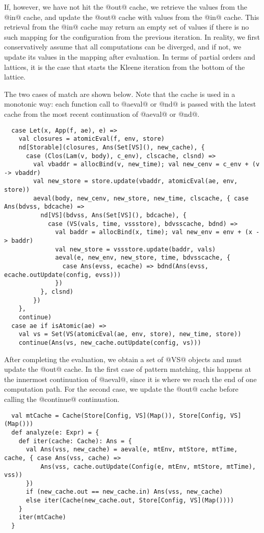 \documentclass[acmsmall, review]{acmart}\settopmatter{}
\begin{document}
If, however, we have not hit the @out@ cache, we retrieve the values from the @in@ cache, 
and update the @out@ cache with values from the @in@ cache. This retrieval from the @in@ 
cache may return an empty set of values if there is no such mapping for the configuration 
from the previous iteration.
In reality, we first conservatively assume that all computations can be diverged, and if 
not, we update its values in the mapping after evaluation. In terms of partial orders and 
lattices, it is the case that starts the Kleene iteration from the bottom of the lattice.

The two cases of match are shown below. Note that the cache is used in a monotonic way: 
each function call to @aeval@ or @nd@ is passed with the latest cache from the most recent 
continuation of @aeval@ or @nd@.

\begin{lstlisting}
  case Let(x, App(f, ae), e) =>
    val closures = atomicEval(f, env, store)
    nd[Storable](closures, Ans(Set[VS](), new_cache), {
      case (Clos(Lam(v, body), c_env), clscache, clsnd) =>
        val vbaddr = allocBind(v, new_time); val new_cenv = c_env + (v -> vbaddr)
        val new_store = store.update(vbaddr, atomicEval(ae, env, store))
        aeval(body, new_cenv, new_store, new_time, clscache, { case Ans(bdvss, bdcache) =>
          nd[VS](bdvss, Ans(Set[VS](), bdcache), {
            case (VS(vals, time, vssstore), bdvsscache, bdnd) =>
              val baddr = allocBind(x, time); val new_env = env + (x -> baddr)
              val new_store = vssstore.update(baddr, vals)
              aeval(e, new_env, new_store, time, bdvsscache, {
                case Ans(evss, ecache) => bdnd(Ans(evss, ecache.outUpdate(config, evss)))
              })
          }, clsnd)
        })
    },
    continue)
  case ae if isAtomic(ae) =>
    val vs = Set(VS(atomicEval(ae, env, store), new_time, store))
    continue(Ans(vs, new_cache.outUpdate(config, vs)))
\end{lstlisting}

After completing the evaluation, we obtain a set of @VS@ objects and must update the @out@ cache.
In the first case of pattern matching, this happens at the innermost continuation of @aeval@,
since it is where we reach the end of one computation path.
For the second case, we update the @out@ cache before calling the @continue@ continuation.

\begin{lstlisting}
  val mtCache = Cache(Store[Config, VS](Map()), Store[Config, VS](Map()))
  def analyze(e: Expr) = {
    def iter(cache: Cache): Ans = {
      val Ans(vss, new_cache) = aeval(e, mtEnv, mtStore, mtTime, cache, { case Ans(vss, cache) => 
          Ans(vss, cache.outUpdate(Config(e, mtEnv, mtStore, mtTime), vss))
      })
      if (new_cache.out == new_cache.in) Ans(vss, new_cache)
      else iter(Cache(new_cache.out, Store[Config, VS](Map())))
    }
    iter(mtCache)
  }
\end{lstlisting}
\end{document}
